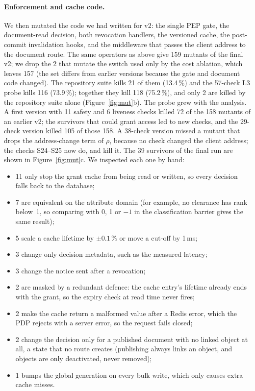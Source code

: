 \documentclass[sigconf,review,anonymous]{acmart}
\begin{document}
\paragraph{Enforcement and cache code.} We then mutated the code we had written for v2: the single PEP gate, the
document-read decision, both revocation handlers, the versioned cache, the post-commit invalidation hooks, and the
middleware that passes the client address to the document route. The same operators as above give 159 mutants of
the final v2; we drop the 2 that mutate the switch used only by the cost ablation, which leaves 157 (the set
differs from earlier versions because the gate and document code changed). The repository suite kills 21 of them
(13.4\,\%) and the 57-check L3 probe kills 116 (73.9\,\%); together they kill 118 (75.2\,\%), and only 2 are
killed by the repository suite alone (Figure~\ref{fig:mut}b). The probe grew with the analysis. A first version
with 11 safety and 6 liveness checks killed 72 of the 158 mutants of an earlier v2; the survivors that could grant
access led to new checks, and the 29-check version killed 105 of those 158. A 38-check version missed a mutant
that drops the address-change term of $\rho$, because no check changed the client address; the checks S24--S25
now do, and kill it. The 39 survivors of the final run are shown in Figure~\ref{fig:mut}c. We inspected each one
by hand:
\begin{itemize}
\item 11 only stop the grant cache from being read or written, so every decision falls back to the database;
\item 7 are equivalent on the attribute domain (for example, no clearance has rank below~1, so comparing with 0, 1
or $-1$ in the classification barrier gives the same result);
\item 5 scale a cache lifetime by $\pm0.1\,\%$ or move a cut-off by 1\,ms;
\item 3 change only decision metadata, such as the measured latency;
\item 3 change the notice sent after a revocation;
\item 2 are masked by a redundant defence: the cache entry's lifetime already ends with the grant, so the expiry
check at read time never fires;
\item 2 make the cache return a malformed value after a Redis error, which the PDP rejects with a server error,
so the request fails closed;
\item 2 change the decision only for a published document with no linked object at all, a state that no route
creates (publishing always links an object, and objects are only deactivated, never removed);
\item 1 bumps the global generation on every bulk write, which only causes extra cache misses.
\end{itemize}
\end{document}
